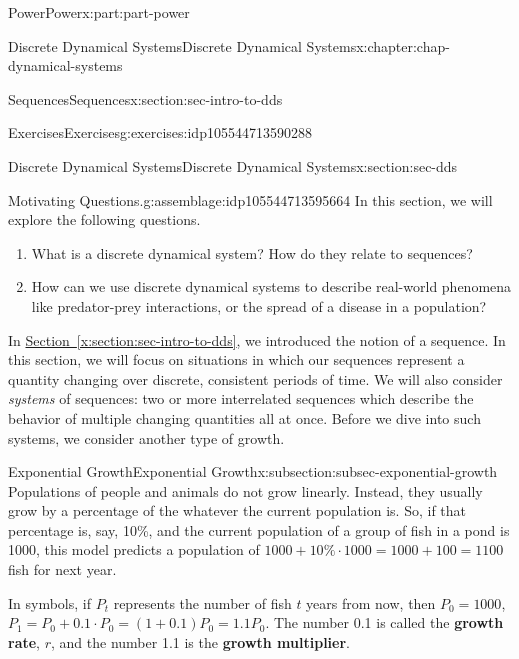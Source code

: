 \documentclass[oneside,10pt,]{book}
\newcommand{\xreffont}{\relax}
\newcommand{\terminology}[1]{\textbf{#1}}
\numberwithin{equation}{section}
\begin{document}
\begin{partptx}{Power}{}{Power}{}{}{x:part:part-power}
\begin{chapterptx}{Discrete Dynamical Systems}{}{Discrete Dynamical Systems}{}{}{x:chapter:chap-dynamical-systems}
\begin{sectionptx}{Sequences}{}{Sequences}{}{}{x:section:sec-intro-to-dds}
\begin{exercises-subsection-numberless}{Exercises}{}{Exercises}{}{}{g:exercises:idp105544713590288}
\end{exercises-subsection-numberless}
\end{sectionptx}
%
%
\typeout{************************************************}
\typeout{************************************************}
%
\begin{sectionptx}{Discrete Dynamical Systems}{}{Discrete Dynamical Systems}{}{}{x:section:sec-dds}
\begin{assemblage}{Motivating Questions.}{g:assemblage:idp105544713595664}%
In this section, we will explore the following questions. %
\begin{enumerate}
\item{}What is a discrete dynamical system? How do they relate to sequences?%
\item{}How can we use discrete dynamical systems to describe real-world phenomena like predator-prey interactions, or the spread of a disease in a population?%
\end{enumerate}
%
\end{assemblage}
\begin{introduction}{}%
In \hyperref[x:section:sec-intro-to-dds]{Section~{\xreffont\ref{x:section:sec-intro-to-dds}}}, we introduced the notion of a sequence. In this section, we will focus on situations in which our sequences represent a quantity changing over discrete, consistent periods of time. We will also consider \emph{systems} of sequences: two or more interrelated sequences which describe the behavior of multiple changing quantities all at once. Before we dive into such systems, we consider another type of growth.%
\end{introduction}%
%
%
\typeout{************************************************}
\typeout{************************************************}
%
\begin{subsectionptx}{Exponential Growth}{}{Exponential Growth}{}{}{x:subsection:subsec-exponential-growth}
Populations of people and animals do not grow linearly. Instead, they usually grow by a percentage of the whatever the current population is. So, if that percentage is, say, 10\%, and the current population of a group of fish in a pond is 1000, this model predicts a population of \(1000 + 10\%\cdot 1000 = 1000 + 100 = 1100\) fish for next year.%
\par
In symbols, if \(P_t\) represents the number of fish \(t\) years from now, then \(P_0 = 1000\), \(P_1 = P_0 + 0.1\cdot P_0 = (1+0.1)P_0 = 1.1 P_0\). The number 0.1 is called the \terminology{growth rate}, \(r\), and the number 1.1 is the \terminology{growth multiplier}.%

\end{subsectionptx}
\end{sectionptx}
\end{chapterptx}
\end{partptx}
\end{document}
